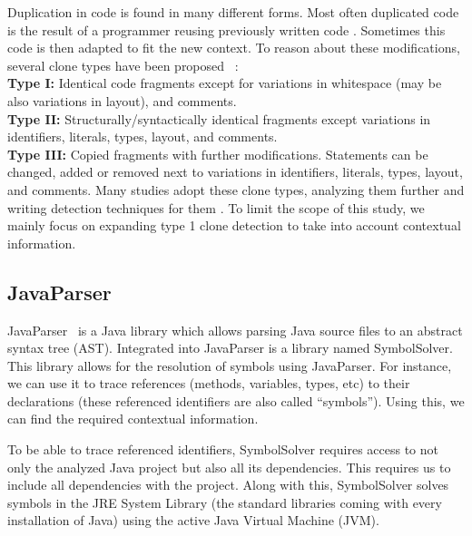 \documentclass[conference]{IEEEtran}
\begin{document}
Duplication in code is found in many different forms. Most often duplicated code is the result of a programmer reusing previously written code \cite{haefliger2008code, baxter1998clone}. Sometimes this code is then adapted to fit the new context. To reason about these modifications, several clone types have been proposed%
~\cite{roy2007survey}:\\
\textbf{Type I:} Identical code fragments except for variations in whitespace (may be also variations in layout), and comments.\\
\textbf{Type II:} Structurally/syntactically identical fragments except variations in identifiers, literals, types, layout, and comments.\\
\textbf{Type III:} Copied fragments with further modifications. Statements can be changed, added or removed next to variations in identifiers, literals, types, layout, and comments.
Many studies adopt these clone types, analyzing them further and writing detection techniques for them \cite{sajnani2016sourcerercc, kodhai2010detection, van2019novel}. To limit the scope of this study, we mainly focus on expanding type 1 clone detection to take into account contextual information.

\subsection{JavaParser}
JavaParser~\cite{tomassetti2017javaparser} is a Java library which allows parsing Java source files to an abstract syntax tree (AST). Integrated into JavaParser is a library named SymbolSolver. This library allows for the resolution of symbols using JavaParser. For instance, we can use it to trace references (methods, variables, types, etc) to their declarations (these referenced identifiers are also called ``symbols''). Using this, we can find the required contextual information.

To be able to trace referenced identifiers, SymbolSolver requires access to not only the analyzed Java project but also all its dependencies. This requires us to include all dependencies with the project. Along with this, SymbolSolver solves symbols in the JRE System Library (the standard libraries coming with every installation of Java) using the active Java Virtual Machine (JVM). %
\end{document}

